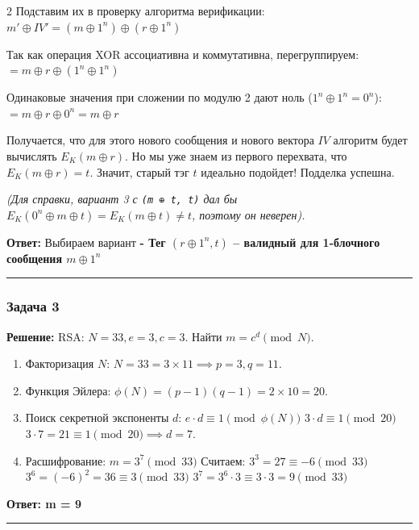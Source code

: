 ﻿\documentclass[10pt,a4paper,landscape]{extarticle}
\newcommand{\tightlist}{}
\begin{document}
\begin{multicols*}{2}
Подставим их в проверку алгоритма верификации: \(m' \oplus IV' = (m \oplus 1^n) \oplus (r \oplus 1^n)\)

Так как операция XOR ассоциативна и коммутативна, перегруппируем: \(= m \oplus r \oplus (1^n \oplus 1^n)\)

Одинаковые значения при сложении по модулю 2 дают ноль (\(1^n \oplus 1^n = 0^n\)): \(= m \oplus r \oplus 0^n = m \oplus r\)

Получается, что для этого нового сообщения и нового вектора \(IV\) алгоритм будет вычислять \(E_K(m \oplus r)\). Но мы уже знаем из первого перехвата, что \(E_K(m \oplus r) = t\). Значит, старый тэг \(t\) идеально подойдет! Подделка успешна.

\emph{(Для справки, вариант 3 с \texttt{(m\ ⊕\ t,\ t)} дал бы \(E_K(0^n \oplus m \oplus t) = E_K(m \oplus t) \neq t\), поэтому он неверен).}

\textbf{Ответ:} Выбираем вариант \textbf{- Тег \((r \oplus 1^n, t)\) -- валидный для 1-блочного сообщения \(m \oplus 1^n\)}

\begin{center}\rule{0.5\linewidth}{0.5pt}\end{center}

\subsubsection{Задача 3}\label{ux437ux430ux434ux430ux447ux430-3}

\textbf{Решение:} RSA: \(N=33, e=3, c=3\). Найти \(m = c^d \pmod N\).

\begin{enumerate}
\def\labelenumi{\arabic{enumi}.}
\tightlist
\item
  Факторизация \(N\): \(N = 33 = 3 \times 11 \implies p=3, q=11\).
\item
  Функция Эйлера: \(\phi(N) = (p-1)(q-1) = 2 \times 10 = 20\).
\item
  Поиск секретной экспоненты \(d\): \(e \cdot d \equiv 1 \pmod{\phi(N)}\) \(3 \cdot d \equiv 1 \pmod{20}\) \(3 \cdot 7 = 21 \equiv 1 \pmod{20} \implies d = 7\).
\item
  Расшифрование: \(m = 3^7 \pmod{33}\) Считаем: \(3^3 = 27 \equiv -6 \pmod{33}\) \(3^6 = (-6)^2 = 36 \equiv 3 \pmod{33}\) \(3^7 = 3^6 \cdot 3 \equiv 3 \cdot 3 = 9 \pmod{33}\)
\end{enumerate}

\textbf{Ответ: m = 9}

\begin{center}\rule{0.5\linewidth}{0.5pt}\end{center}


\end{multicols*}
\end{document}
